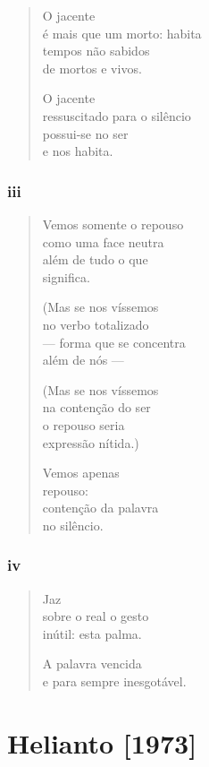 \begin{verse}
O jacente\\
é mais que um morto: habita\\
tempos não sabidos\\
de mortos e vivos.

O jacente\\
ressuscitado para o silêncio\\
possui-se no ser\\
e nos habita.
\end{verse}

\medskip
\section{iii}

\begin{verse}
Vemos somente o repouso\\
como uma face neutra\\
além de tudo o que\\
significa.

(Mas se nos víssemos\\
no verbo totalizado\\
--- forma que se concentra\\
além de nós ---

(Mas se nos víssemos\\
na contenção do ser\\
o repouso seria\\
expressão nítida.)

Vemos apenas\\
repouso:\\
contenção da palavra\\
no silêncio.
\end{verse}

\medskip
\section{iv}

\begin{verse}
Jaz\\
sobre o real o gesto\\
inútil: esta palma.

A palavra vencida\\
e para sempre inesgotável.
\end{verse}

\part{Helianto {[}1973{]}}

